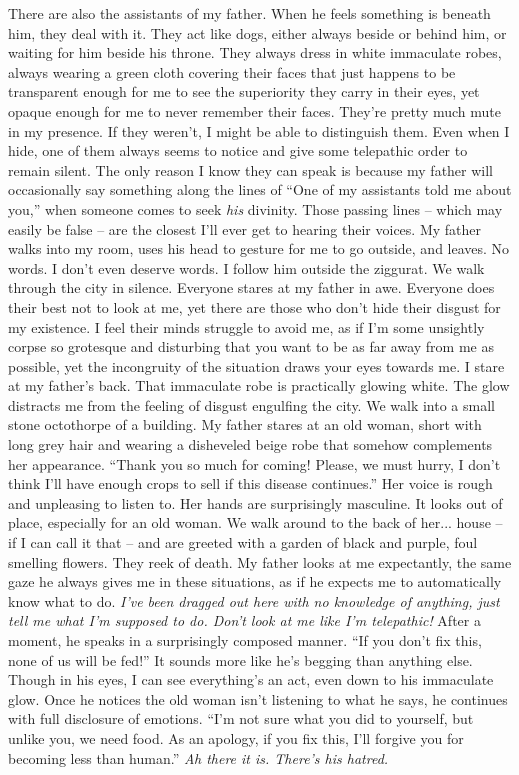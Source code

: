 \documentclass[openany, 12pt]{book}
\newcommand\tab[1][1cm]{\hspace*{#1}}
\begin{document}
There are also the assistants of my father. When he feels something is beneath him, they deal with it. They act like dogs, either always beside or behind him, or waiting for him beside his throne. They always dress in white immaculate robes, always wearing a green cloth covering their faces that just happens to be transparent enough for me to see the superiority they carry in their eyes, yet opaque enough for me to never remember their faces. They're pretty much mute in my presence. If they weren't, I might be able to distinguish them.  Even when I hide, one of them always seems to notice and give some telepathic order to remain silent. The only reason I know they can speak is because my father will occasionally say something along the lines of ``One of my assistants told me about you,'' when someone comes to seek \textit{his} divinity. Those passing lines -- which may easily be false -- are the closest I’ll ever get to hearing their voices.
\newline
\tab
My father walks into my room, uses his head to gesture for me to go outside, and leaves. No words. I don’t even deserve words. I follow him outside the ziggurat. We walk through the city in silence. Everyone stares at my father in awe. Everyone does their best not to look at me, yet there are those who don’t hide their disgust for my existence. I feel their minds struggle to avoid me, as if I’m some unsightly corpse so grotesque and disturbing that you want to be as far away from me as possible, yet the incongruity of the situation draws your eyes towards me. I stare at my father’s back. That immaculate robe is practically glowing white. The glow distracts me from the feeling of disgust engulfing the city. We walk into a small stone octothorpe of a building. My father stares at an old woman, short with long grey hair and wearing a disheveled beige robe that somehow complements her appearance.
\newline
\tab
``Thank you so much for coming! Please, we must hurry, I don’t think I’ll have enough crops to sell if this disease continues.'' Her voice is rough and unpleasing to listen to. Her hands are surprisingly masculine. It looks out of place, especially for an old woman.
\newline
\tab
We walk around to the back of her... house -- if I can call it that -- and are greeted with a garden of black and purple, foul smelling flowers. They reek of death. My father looks at me expectantly, the same gaze he always gives me in these situations, as if he expects me to automatically know what to do. \textit{I’ve been dragged out here with no knowledge of anything, just tell me what I’m supposed to do. Don’t look at me like I’m telepathic!} After a moment, he speaks in a surprisingly composed manner. ``If you don’t fix this, none of us will be fed!'' It sounds more like he’s begging than anything else. Though in his eyes, I can see everything’s an act, even down to his immaculate glow. Once he notices the old woman isn’t listening to what he says, he continues with full disclosure of emotions. ``I’m not sure what you did to yourself, but unlike you, we need food. As an apology, if you fix this, I’ll forgive you for becoming less than human.'' \textit{Ah there it is. There’s his hatred.}
\end{document}
